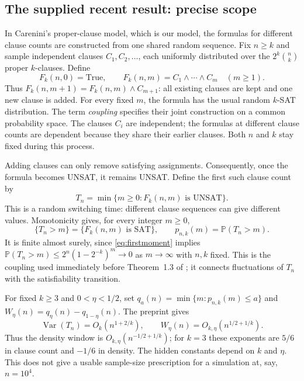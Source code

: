 \subsection{The supplied recent result: precise scope}
In Carenini's proper-clause model, which is our model, the formulas for
different clause counts are constructed from one shared random sequence.
Fix $n\ge k$ and sample independent clauses $C_1,C_2,\ldots$, each uniformly
distributed over the $2^k\binom nk$ proper $k$-clauses. Define
\begin{equation}
 F_k(n,0)=\mathrm{True},\qquad
 F_k(n,m)=C_1\land\cdots\land C_m\quad(m\ge1).
 \label{eq:clauseprocess}
\end{equation}
Thus $F_k(n,m+1)=F_k(n,m)\land C_{m+1}$: all existing clauses are kept
and one new clause is added. For every fixed $m$, the formula has the usual
random $k$-SAT distribution. The term \emph{coupling} specifies their joint
construction on a common probability space. The clauses $C_i$ are independent;
the formulas at different clause counts are dependent because they share
their earlier clauses. Both $n$ and $k$ stay fixed during this process.

Adding clauses can only remove satisfying assignments. Consequently, once
the formula becomes UNSAT, it remains UNSAT. Define the first such clause
count by
\begin{equation}
 T_n=\min\{m\ge0:F_k(n,m)\text{ is UNSAT}\}.
 \label{eq:hittingtime}
\end{equation}
This is a random switching time: different clause sequences can give
different values. Monotonicity gives, for every integer $m\ge0$,
\begin{equation}
 \{T_n>m\}=\{F_k(n,m)\text{ is SAT}\},\qquad
 p_{n,k}(m)=\mathbb P(T_n>m).
 \label{eq:hittingprobability}
\end{equation}
It is finite almost surely, since \eqref{eq:firstmoment} implies
$\mathbb P(T_n>m)\le2^n(1-2^{-k})^m\to0$ as $m\to\infty$ with $n,k$ fixed.
This is the coupling used immediately before Theorem~1.3 of
\citet[p.~2]{carenini2026}; it connects fluctuations of $T_n$ with the
satisfiability transition.

For fixed $k\ge3$ and $0<\eta<1/2$, set
$q_a(n)=\min\{m:p_{n,k}(m)\le a\}$ and
$W_\eta(n)=q_\eta(n)-q_{1-\eta}(n)$.
The preprint gives
\begin{equation}
 \operatorname{Var}(T_n)=O_k(n^{1+2/k}),\qquad
 W_\eta(n)=O_{k,\eta}(n^{1/2+1/k}).
 \label{eq:carenini}
\end{equation}
Thus the density window is $O_{k,\eta}(n^{-1/2+1/k})$; for $k=3$ these
exponents are $5/6$ in clause count and $-1/6$ in density. The hidden
constants depend on $k$ and $\eta$. This does not give a usable sample-size
prescription for a simulation at, say, $n=10^4$.

